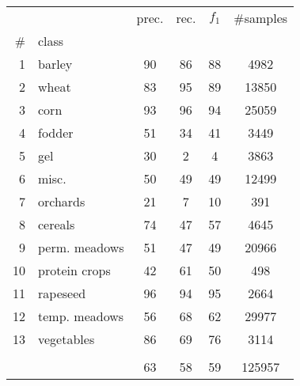 \begin{tabular}{rlcccc}
\toprule
   &                       &  prec. & rec. & $f_1$ & \#samples \\
\# & class &            &             &             &          \\
\midrule
1 & barley &         90 &          86 &          88 &     4982 \\
2 & wheat &         83 &          95 &          89 &    13850 \\
3 & corn &         93 &          96 &          94 &    25059 \\
4 & fodder &         51 &          34 &          41 &     3449 \\
5 & gel &         30 &           2 &           4 &     3863 \\
6 & misc. &         50 &          49 &          49 &    12499 \\
7 & orchards &         21 &           7 &          10 &      391 \\
8 & cereals &         74 &          47 &          57 &     4645 \\
9 & perm. meadows &         51 &          47 &          49 &    20966 \\
10 & protein crops &         42 &          61 &          50 &      498 \\
11 & rapeseed &         96 &          94 &          95 &     2664 \\
12 & temp. meadows &         56 &          68 &          62 &    29977 \\
13 & vegetables &         86 &          69 &          76 &     3114 \\
   &                       &            &             &             &          \\
   &                       &         63 &          58 &          59 &   125957 \\
\bottomrule
\end{tabular}

